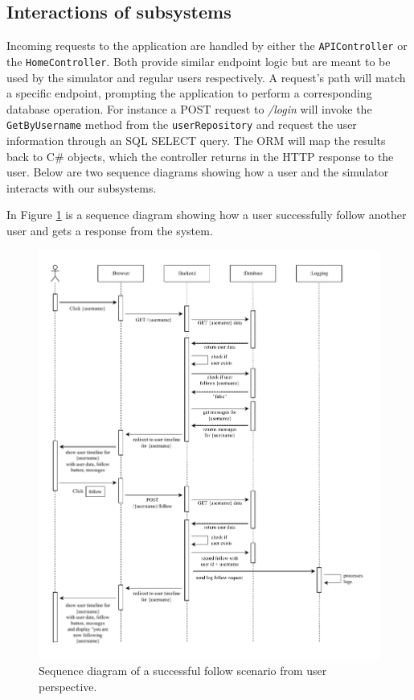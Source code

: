 \subsection{Interactions of subsystems}
Incoming requests to the application are handled by either the \texttt{APIController} or the \texttt{HomeController}. Both provide similar endpoint logic but are meant to be used by the simulator and regular users respectively. A request's path will match a specific endpoint, prompting the application to perform a corresponding database operation. For instance a POST request to \textit{/login} will invoke the \texttt{GetByUsername} method from the \texttt{userRepository} and request the user information through an SQL SELECT query. The ORM will map the results back to C\# objects, which the controller returns in the HTTP response to the user. Below are two sequence diagrams showing how a user and the simulator interacts with our subsystems.\newline

In Figure \ref{fig:homecontroller} is a sequence diagram showing how a user successfully follow another user and gets a response from the system.\newline

\begin{figure}[H]
  \begin{center}
\includegraphics[width=\textwidth]{images/figures/Sequence-client.pdf}
    \caption{Sequence diagram of a successful follow scenario from user perspective.}
    \label{fig:homecontroller}
  \end{center}
\end{figure}

